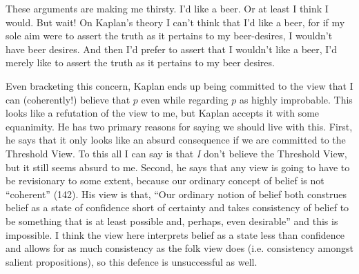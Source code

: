 These arguments are making me thirsty. I'd like a beer. Or at least I think I would. But wait! On Kaplan's theory I can't think that I'd like a beer, for if my sole aim were to assert the truth as it pertains to my beer-desires, I wouldn't have beer desires. And then I'd prefer to assert that I wouldn't like a beer, I'd merely like to assert the truth as it pertains to my beer desires. 

Even bracketing this concern, Kaplan ends up being committed to the view that I can (coherently!) believe that \(p\) even while regarding \(p\) as highly improbable. This looks like a refutation of the view to me, but Kaplan accepts it with some equanimity. He has two primary reasons for saying we should live with this. First, he says that it only looks like an absurd consequence if we are committed to the Threshold View. To this all I can say is that \textit{I} don't believe the Threshold View, but it still seems absurd to me. Second, he says that any view is going to have to be revisionary to some extent, because our ordinary concept of belief is not ``coherent'' (142). His view is that, ``Our ordinary notion of belief both construes belief as a state of confidence short of certainty and takes consistency of belief to be something that is at least possible and, perhaps, even desirable'' and this is impossible. I think the view here interprets belief as a state less than confidence and allows for as much consistency as the folk view does (i.e. consistency amongst salient propositions), so this defence is unsuccessful as well.